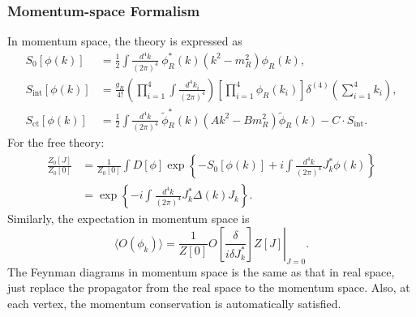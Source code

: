 \subsubsection{Momentum-space Formalism}
In momentum space, the theory is expressed as
\begin{equation}
\begin{aligned}
	S_0[\phi(k)] &= \frac{1}{2} \int\frac{d^4 k}{(2\pi)^4}\ \phi_R^*(k)(k^2-m_R^2) \phi_R(k), \\
	S_\mathrm{int}[\phi(k)] &= \frac{g_R}{4!} \left(\prod_{i=1}^{4} \int \frac{d^4 k_i}{(2\pi)^4} \right) \left[\prod_{i=1}^4 \phi_R(k_i)\right] \delta^{(4)}\left(\sum_{i=1}^4 k_i\right), \\
	S_{\mathrm{ct}}[\phi(k)] &= \frac{1}{2} \int\frac{d^4 k}{(2\pi)^4}\ \tilde\phi_R^*(k)(A k^2 - B m_R^2) \tilde\phi_R(k) - C \cdot S_\mathrm{int}.
\end{aligned}
\end{equation}
For the free theory:
\begin{equation}
\begin{aligned}
	\frac{Z_0[J]}{Z_0[0]} &= \frac{1}{Z_0[0]}\int D[\phi] \exp\left\{ -S_0[\phi(k)] + i \int\frac{d^4 k}{(2\pi)^4} J_k^* \phi(k) \right\} \\
	&= \exp\left\{ -i \int\frac{d^4 k}{(2\pi)^4} J^*_k \Delta(k) J_k \right\}.
\end{aligned}
\end{equation}
Similarly, the expectation in momentum space is
\begin{equation}
	\langle O(\phi_k)\rangle
	= \frac{1}{Z[0]} \left. O\left[\frac{\delta}{i\delta J^*_k}\right] Z[J] \right|_{J=0}.
\end{equation}
The Feynman diagrams in momentum space is the same as that in real space, just replace the propagator from the real space to the momentum space.
Also, at each vertex, the momentum conservation is automatically satisfied.


